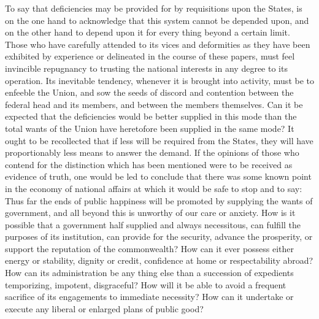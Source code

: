 To say that deficiencies may be provided for by requisitions upon the States, is on the one hand to acknowledge that this system cannot be depended upon, and on the other hand to depend upon it for every thing beyond a certain limit. Those who have carefully attended to its vices and deformities as they have been exhibited by experience or delineated in the course of these papers, must feel invincible repugnancy to trusting the national interests in any degree to its operation. Its inevitable tendency, whenever it is brought into activity, must be to enfeeble the Union, and sow the seeds of discord and contention between the federal head and its members, and between the members themselves. Can it be expected that the deficiencies would be better supplied in this mode than the total wants of the Union have heretofore been supplied in the same mode? It ought to be recollected that if less will be required from the States, they will have proportionably less means to answer the demand. If the opinions of those who contend for the distinction which has been mentioned were to be received as evidence of truth, one would be led to conclude that there was some known point in the economy of national affairs at which it would be safe to stop and to say: Thus far the ends of public happiness will be promoted by supplying the wants of government, and all beyond this is unworthy of our care or anxiety. How is it possible that a government half supplied and always necessitous, can fulfill the purposes of its institution, can provide for the security, advance the prosperity, or support the reputation of the commonwealth? How can it ever possess either energy or stability, dignity or credit, confidence at home or respectability abroad? How can its administration be any thing else than a succession of expedients temporizing, impotent, disgraceful? How will it be able to avoid a frequent sacrifice of its engagements to immediate necessity? How can it undertake or execute any liberal or enlarged plans of public good?

